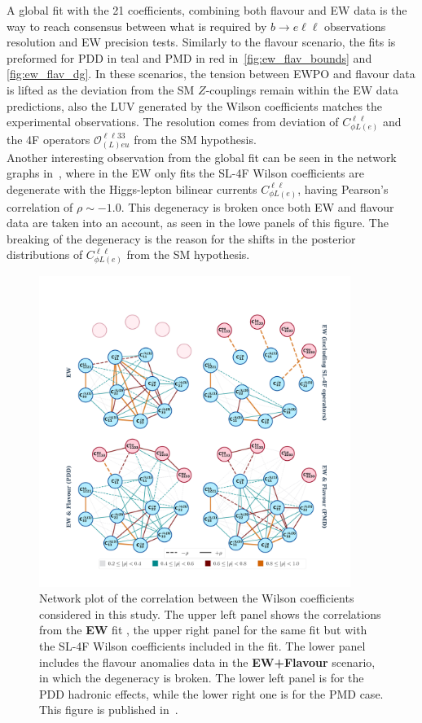 A global fit  with the 21 coefficients, combining both flavour and EW data is the way to reach consensus between what is required by $ b \to e \ell \ell$ observations resolution and EW precision tests. Similarly to the flavour scenario, the fits is preformed for PDD in \textcolor[HTML]{0f7678}{teal}  and PMD in \textcolor[HTML]{760003}{red} in~\autoref{fig:ew_flav_bounds} and \autoref{fig:ew_flav_dg}. In these scenarios, the tension between EWPO and flavour data is lifted as the deviation from the SM $Z$-couplings remain within the EW data predictions, also the LUV generated by the Wilson coefficients matches the experimental observations. The resolution comes from deviation of $C_{\phi L (e)}^{\ell \ell}$ and the 4F operators $\mathcal{O}_{(L)eu}^{\ell \ell 3 3}$ from the SM hypothesis. \\ Another interesting observation from the global fit can be seen in the network graphs in~\cite{fig:ew_flav_corr}, where in the EW only fits the SL-4F Wilson coefficients are degenerate with the Higgs-lepton bilinear currents $C_{\phi L (e)}^{\ell \ell}$, having Pearson's correlation of  $\rho \sim -1.0$. This degeneracy is broken once both EW and flavour data are taken into an account, as seen in the lowe panels of this figure. The breaking of the degeneracy is the reason for the shifts in the posterior distributions of $C_{\phi L (e)}^{\ell \ell}$ from the SM hypothesis. \\
\begin{figure}[h!]
	\centering
	\includegraphics[width=0.9\textwidth]{figures/fixed_EW_flavour.pdf}
	\caption{ Network plot of the correlation between the Wilson coefficients considered in this study. The upper left panel shows the correlations from the \textbf{EW} fit , the upper right panel for the same fit but with the SL-4F Wilson coefficients included in the fit. The lower panel includes the flavour anomalies data  in the \textbf{EW+Flavour}  scenario, in which the degeneracy is broken. The lower left panel is for the PDD hadronic effects, while the lower right one is for the PMD case. This figure is published in~\cite{Alasfar:2020mne}. 
	}
	\label{fig:ew_flav_corr}
\end{figure}
